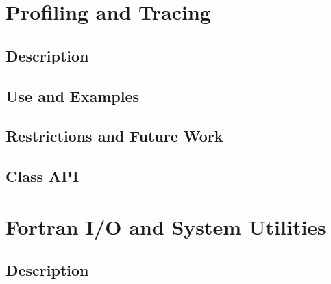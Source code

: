 \documentclass[english]{article}
\begin{document}
\section{Profiling and Tracing}
\subsection{Description}

\subsection{Use and Examples}



\subsection{Restrictions and Future Work}

\subsection{Class API}

%
\section{Fortran I/O and System Utilities}
\subsection{Description}

%
%
\end{document}

